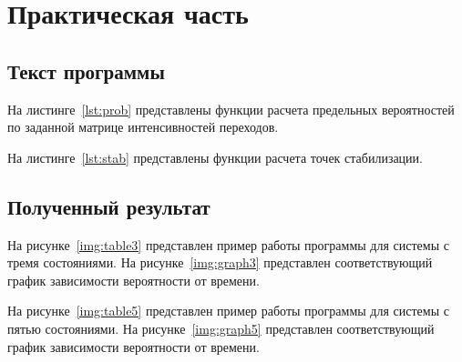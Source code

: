 \chapter{Практическая часть}

\section{Текст программы}

На листинге~\ref{lst:prob} представлены функции расчета предельных вероятностей
по заданной матрице интенсивностей переходов.

{
\captionsetup{format=hang,justification=raggedright,
              singlelinecheck=off,width=16cm}

На листинге~\ref{lst:stab} представлены функции расчета точек стабилизации.

}

\clearpage
\section{Полученный результат}

На рисунке~\ref{img:table3} представлен пример работы программы для системы с
тремя состояниями. На рисунке~\ref{img:graph3} представлен соответствующий график
зависимости вероятности от времени.



На рисунке~\ref{img:table5} представлен пример работы программы для системы с
пятью состояниями. На рисунке~\ref{img:graph5} представлен соответствующий график
зависимости вероятности от времени.


